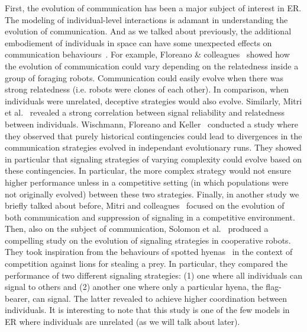         First, the evolution of communication has been a major subject of interest in ER. The modeling of individual-level interactions is adamant in understanding the evolution of communication. And as we talked about previously, the additional embodiement of individuals in space can have some unexpected effects on communication behaviours~\parencite{Mitri2009}. For example, Floreano \& colleagues~\parencite{Floreano2007} showed how the evolution of communication could vary depending on the relatedness inside a group of foraging robots. Communication could easily evolve when there was strong relatedness (i.e. robots were clones of each other). In comparison, when individuals were unrelated, deceptive strategies would also evolve. Similarly, Mitri et al.~\parencite{Mitri2011} revealed a strong correlation between signal reliability and relatedness between individuals. Wischmann, Floreano and Keller~\parencite{Wischmann2012} conducted a study where they observed that purely historical contingencies could lead to divergences in the communication strategies evolved in independant evolutionary runs. They showed in particular that signaling strategies of varying complexity could evolve based on these contingencies. In particular, the more complex strategy would not ensure higher performance unless in a competitive setting (in which populations were not originally evolved) between these two strategies. Finally, in another study we briefly talked about before, Mitri and colleagues~\parencite{Mitri2009} focused on the evolution of both communication and suppression of signaling in a competitive environment. Then, also on the subject of communication, Solomon et al.~\parencite{Solomon2012} produced a compelling study on the evolution of signaling strategies in cooperative robots. They took inspiration from the behaviours of spotted hyenas~\parencite{Smith2010} in the context of competition against lions for stealing a prey. In particular, they compared the performance of two different signaling strategies: (1) one where all individuals can signal to others and (2) another one where only a particular hyena, the flag-bearer, can signal. The latter revealed to achieve higher coordination between individuals. It is interesting to note that this study is one of the few models in ER where individuals are unrelated (as we will talk about later). 

